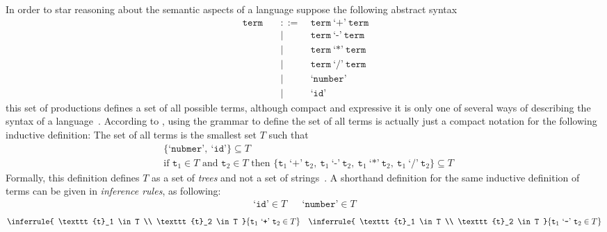 \documentclass[
  oneside,
  english,
  coorientadorbanca,
  noabntexcite
]{ufsc-thesis-rn46-2019}
\def\bnfdef{::=}
\newcommand{\code}[1]{\texttt{#1}}
\newcommand{\bnfvar}[1]{\ \bnfvars{#1}}
\newcommand{\bnfvars}[1]{\code{#1}}
\newcommand{\bnfter}[1]{\ \bnfters{#1}}
\newcommand{\bnfters}[1]{\textrm{`}\code{#1}\textrm{'}}
\newcommand{\bnfprod}[2]{\bnfvars{#1} &\ &\bnfdef& #2}
\newcommand{\bnfmore}[1]{ && \mid{} & #1}
\begin{document}
In order to star reasoning about the semantic aspects of a language suppose the following abstract syntax
\begin{equation}~\label{eq:sample_term_ast}
  \begin{alignedat}{2}
    \bnfprod{term}{\bnfvar{term} \bnfter{+} \bnfvar{term}} \\
    \bnfmore{\bnfvar{term} \bnfter{-} \bnfvar{term}}       \\
    \bnfmore{\bnfvar{term} \bnfter{*} \bnfvar{term}}       \\
    \bnfmore{\bnfvar{term} \bnfter{/} \bnfvar{term}}       \\
    \bnfmore{\bnfter{number}}                              \\
    \bnfmore{\bnfter{id}}
  \end{alignedat}
\end{equation}
this set of productions defines a set of all possible terms, although compact and expressive it is only one of several ways of describing the syntax of a language~\cite{pierce2002types}.
According to \textcite{pierce2002types}, using the grammar to define the set of all terms is actually just a compact notation for the following inductive definition: The set of all terms is the smallest set $T$ such that
\begin{align}
   & \{\bnfters{nubmer}, \bnfter{id}\} \subseteq T \label{eq:example_clause1}            \\
   & \textrm{if } \bnfvars{t}_1 \in T \textrm{ and } \bnfvars{t}_2 \in T \textrm{ then }
  \{
  \bnfvars{t}_1 \bnfter{+} \bnfvar{t}_2,
  \bnfvar{t}_1 \bnfter{-} \bnfvar{t}_2,
  \bnfvar{t}_1 \bnfter{*} \bnfvar{t}_2,
  \bnfvar{t}_1 \bnfter{/} \bnfvar{t}_2
  \} \subseteq T\label{eq:example_clause2}
\end{align}
Formally, this definition defines $T$ as a set of \textit{trees} and not a set of strings~\cite{pierce2002types}.
A shorthand definition for the same inductive definition of terms can be given in \textit{inference rules}, as following:
\begin{align*}
  \bnfters{id} \in T &  & \bnfters{number} \in T
\end{align*}
\begin{align*}
  \inferrule{
  \bnfvars{t}_1 \in T \\ \bnfvars{t}_2 \in T
  }{
    \bnfvars{t}_1 \bnfter{+} \bnfvar{t}_2 \in T
  }
   &  &
  \inferrule{
  \bnfvars{t}_1 \in T \\ \bnfvars{t}_2 \in T
  }{
    \bnfvars{t}_1 \bnfter{-} \bnfvar{t}_2 \in T
  }
\end{align*}
\end{document}
